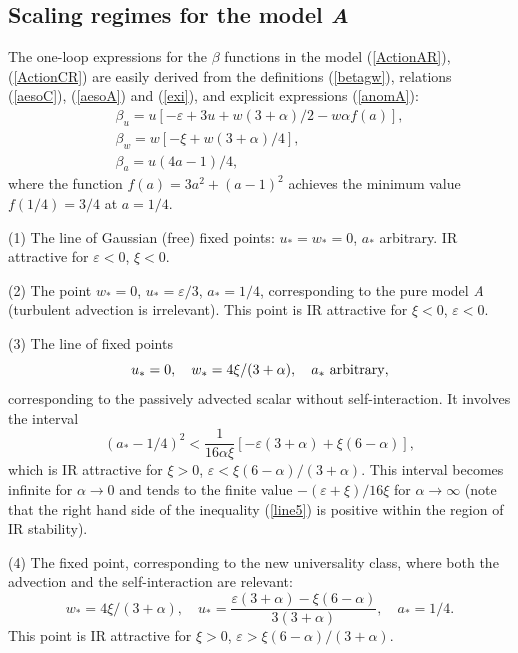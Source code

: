 \documentclass[12pt]{article}
\begin{document}
\subsection{Scaling regimes for the model {\it A}} \label{sec:GPA}

The one-loop expressions for the $\beta$ functions in the model
(\ref{ActionAR}), (\ref{ActionCR}) are easily derived from the definitions
(\ref{betagw}), relations (\ref{aesoC}), (\ref{aesoA}) and (\ref{exi}),
and explicit expressions (\ref{anomA}):
\begin{eqnarray}
\beta_{u} = u \left[ -\varepsilon+ 3u + w(3+\alpha)/2 -w\alpha f(a) \right],
\nonumber \\
\beta_{w} = w \left[ -\xi + w(3+\alpha)/4 \right],
\nonumber \\
\beta_{a} = u(4a-1)/4,
\label{betaA}
\end{eqnarray}
where the function $f(a)=3a^{2}+(a-1)^{2}$ achieves the minimum value
$f(1/4) =3/4$ at $a=1/4$.


(1) The line of Gaussian (free) fixed points: $u_{*}=w_{*}=0$, $a_{*}$
arbitrary. IR attractive for $\varepsilon<0$, $\xi<0$.

(2) The point $w_{*}=0$, $u_{*}=\varepsilon/3$, $a_{*}=1/4$, corresponding
to the pure model {\it A} (turbulent advection is irrelevant). This point
is IR attractive for $\xi<0$, $\varepsilon<0$.

(3) The line of fixed points
\begin{equation}
u_{*}=0, \quad w_{*}=4\xi/(3+\alpha), \quad  a_{*} \ {\rm arbitrary},
\label{line4}
\end{equation}
corresponding to the passively advected scalar without self-interaction.
It involves the interval
\begin{equation}
(a_{*}-1/4)^{2} < \frac{1}{16\alpha\xi} \left[ -\varepsilon(3+\alpha) +
\xi(6-\alpha)  \right],
\label{line5}
\end{equation}
which is IR attractive for $\xi>0$, $\varepsilon< \xi (6-\alpha)/(3+\alpha)$.
This interval becomes infinite for $\alpha\to0$ and tends to the finite
value $-(\varepsilon+\xi)/16\xi$ for $\alpha\to\infty$ (note that the right hand
side of the inequality (\ref{line5}) is positive within the region of
IR stability).


(4) The fixed point, corresponding to the new universality class, where
both the advection and the self-interaction are relevant:
\begin{equation}
w_{*}= 4\xi/(3+\alpha), \quad u_{*} = \frac{ \varepsilon (3+\alpha) -
\xi(6-\alpha)} {3(3+\alpha)}, \quad a_{*}=1/4.
\label{wu44}
\end{equation}
This point is IR attractive for $\xi>0$,
$\varepsilon> \xi (6-\alpha)/(3+\alpha)$.
\end{document}
